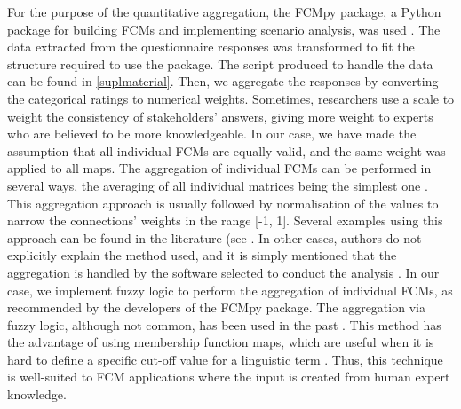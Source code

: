 For the purpose of the quantitative aggregation, the FCMpy package, a Python package for building FCMs and implementing scenario analysis, was used \citep{mkhitaryan2022fcmpy}. The data extracted from the questionnaire responses was transformed to fit the structure required to use the package. The script produced to handle the data can be found in \cref{suplmaterial}. Then, we aggregate the responses by converting the categorical ratings to numerical weights. Sometimes, researchers use a scale to weight the consistency of stakeholders' answers, giving more weight to experts who are believed to be more knowledgeable. In our case, we have made the assumption that all individual FCMs are equally valid, and the same weight was applied to all maps. The aggregation of individual FCMs can be performed in several ways, the averaging of all individual matrices being the simplest one \citep{jetter2014fuzzy}. This aggregation approach is usually followed by normalisation of the values to narrow the connections' weights in the range [-1, 1]. Several examples using this approach can be found in the literature (see \citep{lopolito2020combined, morone2021using, morone2019promote}. In other cases, authors do not explicitly explain the method used, and it is simply mentioned that the aggregation is handled by the software selected to conduct the analysis \cite{konti2022determinants, kokkinos2020circular, falcone2020use}. In our case, we implement fuzzy logic to perform the aggregation of individual FCMs, as recommended by the developers of the FCMpy package. The aggregation via fuzzy logic, although not common, has been used in the past \citep{nasirzadeh2020modelling, amini2022combined}. This method has the advantage of using membership function maps, which are useful when it is hard to define a specific cut-off value for a linguistic term \citep{wang2015study}. Thus, this technique is well-suited to FCM applications where the input is created from human expert knowledge. 

